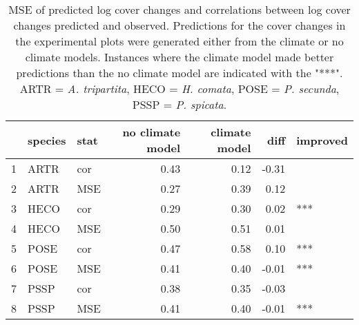 \begin{table}[H]
\centering
\caption{MSE of predicted log cover changes and correlations between log cover changes predicted and observed. Predictions for the cover changes in the experimental plots were generated either from the climate or no climate models. Instances where the climate model made better predictions than the no climate model are indicated with the "***". ARTR = \textit{A. tripartita}, HECO = \textit{H. comata}, POSE = \textit{P. secunda}, PSSP = \textit{P. spicata}.} 
\label{table:corPGR}
\begin{tabular}{rllrrrl}
  \hline
 & species & stat & no climate model & climate model & diff & improved \\ 
  \hline
1 & ARTR & cor & 0.43 & 0.12 & -0.31 &  \\ 
  2 & ARTR & MSE & 0.27 & 0.39 & 0.12 &  \\ 
  3 & HECO & cor & 0.29 & 0.30 & 0.02 & *** \\ 
  4 & HECO & MSE & 0.50 & 0.51 & 0.01 &  \\ 
  5 & POSE & cor & 0.47 & 0.58 & 0.10 & *** \\ 
  6 & POSE & MSE & 0.41 & 0.40 & -0.01 & *** \\ 
  7 & PSSP & cor & 0.38 & 0.35 & -0.03 &  \\ 
  8 & PSSP & MSE & 0.41 & 0.40 & -0.01 & *** \\ 
   \hline
\end{tabular}
\end{table}
